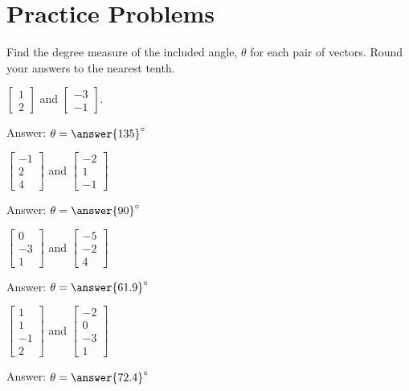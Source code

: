 \documentclass{ximera}
\begin{document}
\section*{Practice Problems}
\begin{problem}
Find the degree measure of the included angle, $\theta$ for each pair of vectors.  Round your answers to the nearest tenth.
  \begin{problem}
  $\begin{bmatrix}1\\2\end{bmatrix}$ and $\begin{bmatrix}-3\\-1\end{bmatrix}$.
  
  Answer: $\theta=\answer{135}^\circ$
  \end{problem}
  
  \begin{problem}
  $\begin{bmatrix}-1\\2\\4\end{bmatrix}$ and $\begin{bmatrix}-2\\1\\-1\end{bmatrix}$
  
   Answer: $\theta=\answer{90}^\circ$
  \end{problem}

\begin{problem}
  $\begin{bmatrix}0\\-3\\1\end{bmatrix}$ and $\begin{bmatrix}-5\\-2\\4\end{bmatrix}$
  
   Answer: $\theta=\answer{61.9}^\circ$
  \end{problem}

\begin{problem}
  $\begin{bmatrix}1\\1\\-1\\2\end{bmatrix}$ and $\begin{bmatrix}-2\\0\\-3\\1\end{bmatrix}$
  
   Answer: $\theta=\answer{72.4}^\circ$
  \end{problem}
  
  \end{problem}
\end{document}

